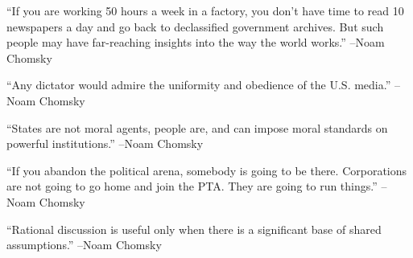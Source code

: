 \documentclass{article}%
\begin{document}
\linebreak%
\vspace{1mm}%
\begin{minipage}{\textwidth}%
\flushleft%
“If you are working 50 hours a week in a factory, you don't have time to read 10 newspapers a day and go back to declassified government archives. But such people may have far{-}reaching insights into the way the world works.”%
\linebreak%
\vspace{1mm}%
–Noam Chomsky%
\linebreak%
\vspace{1mm}%
\end{minipage}%
\linebreak%
\vspace{1mm}%
\begin{minipage}{\textwidth}%
\flushleft%
“Any dictator would admire the uniformity and obedience of the U.S. media.”%
\linebreak%
\vspace{1mm}%
–Noam Chomsky%
\linebreak%
\vspace{1mm}%
\end{minipage}%
\linebreak%
\vspace{1mm}%
\begin{minipage}{\textwidth}%
\flushleft%
“States are not moral agents, people are, and can impose moral standards on powerful institutions.”%
\linebreak%
\vspace{1mm}%
–Noam Chomsky%
\linebreak%
\vspace{1mm}%
\end{minipage}%
\linebreak%
\vspace{1mm}%
\begin{minipage}{\textwidth}%
\flushleft%
“If you abandon the political arena, somebody is going to be there. Corporations are not going to go home and join the PTA. They are going to run things.”%
\linebreak%
\vspace{1mm}%
–Noam Chomsky%
\linebreak%
\vspace{1mm}%
\end{minipage}%
\linebreak%
\vspace{1mm}%
\begin{minipage}{\textwidth}%
\flushleft%
“Rational discussion is useful only when there is a significant base of shared assumptions.”%
\linebreak%
\vspace{1mm}%
–Noam Chomsky%
\linebreak%
\vspace{1mm}%
\end{minipage}%
\end{document}
